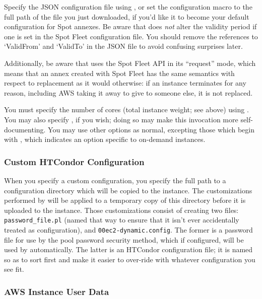 
Specify the JSON configuration file using ,
or set the configuration macro  to
the full path of the file you just downloaded, if you'd like it to become
your default configuration for Spot annexes.  Be aware that 
does \emph{not} alter the validity period if one is set in the Spot
Fleet configuration file.  You should remove the references to `ValidFrom'
and `ValidTo' in the JSON file to avoid confusing surprises later.

Additionally, be aware that  uses the Spot Fleet API in
its ``request'' mode, which means that an annex created with Spot
Fleet has the same semantics with respect to replacement as it would
otherwise: if an instance terminates for any reason, including AWS
taking it away to give to someone else, it is not replaced.

You must specify the number of cores (total instance weight; see above) using
.  You may also specify , if you wish;
doing so may make this  invocation more self-documenting.
You may use other options as normal, excepting those which begin with
, which indicates an option specific to on-demand
instances.

\subsubsection{Custom HTCondor Configuration}

When you specify a custom configuration, you specify the full path to a
configuration directory which will be copied to the instance.  The customizations
performed by  will be applied to a temporary copy of this
directory before it is uploaded to the instance.  Those customizations
consist of creating two files: {\tt password\_file.pl} (named that way to ensure
that it isn't ever accidentally treated as configuration), and
{\tt 00ec2-dynamic.config}.  The former is a password file for use by the pool
password security method, which if configured, will be used by 
automatically.  The latter is an HTCondor configuration file; it is named
so as to sort first and make it easier to over-ride with whatever configuration
you see fit.

\subsubsection{AWS Instance User Data}

